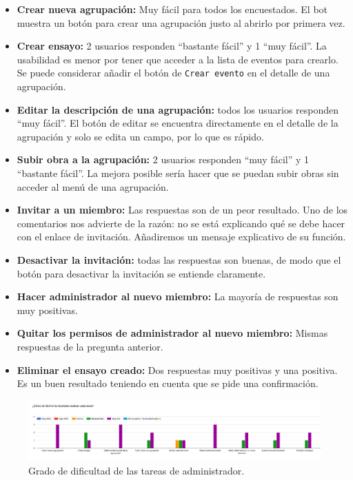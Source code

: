 \begin{itemize}
    \item \textbf{Crear nueva agrupación:} Muy fácil para todos los encuestados. El bot muestra un botón para crear una agrupación justo al abrirlo por primera vez.
    \item \textbf{Crear ensayo:} 2 usuarios responden ``bastante fácil'' y 1 ``muy fácil''. La usabilidad es menor por tener que acceder a la lista de eventos para crearlo. Se puede considerar añadir el botón de \texttt{Crear evento} en el detalle de una agrupación.
    \item \textbf{Editar la descripción de una agrupación:} todos los usuarios responden ``muy fácil''. El botón de editar se encuentra directamente en el detalle de la agrupación y solo se edita un campo, por lo que es rápido.
    \item \textbf{Subir obra a la agrupación:} 2 usuarios responden ``muy fácil'' y 1 ``bastante fácil''. La mejora posible sería hacer que se puedan subir obras sin acceder al menú de una agrupación.
    \item \textbf{Invitar a un miembro:} Las respuestas son de un peor resultado. Uno de los comentarios nos advierte de la razón: no se está explicando qué se debe hacer con el enlace de invitación. Añadiremos un mensaje explicativo de su función.
    \item \textbf{Desactivar la invitación:} todas las respuestas son buenas, de modo que el botón para desactivar la invitación se entiende claramente.
    \item \textbf{Hacer administrador al nuevo miembro:} La mayoría de respuestas son muy positivas.
    \item \textbf{Quitar los permisos de administrador al nuevo miembro:} Mismas respuestas de la pregunta anterior.
    \item \textbf{Eliminar el ensayo creado:} Dos respuestas muy positivas y una positiva. Es un buen resultado teniendo en cuenta que se pide una confirmación.
\end{itemize}

\begin{figure}[h]
\centering
\includegraphics[width=\textwidth]{imagenes/pruebas/tareas_admin.png}
\caption{Grado de dificultad de las tareas de administrador.}
\label{fig:graficoTareasAdmin}
\end{figure}

